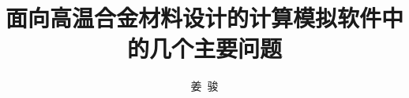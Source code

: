 
\title{面向高温合金材料设计的计算模拟软件中的几个主要问题}
\author[ ]{姜~骏}   %
\renewcommand*{\Authfont}{\small\rm} %
\renewcommand*{\Affilfont}{\small\it} %
\renewcommand\Authands{ and } %
\renewcommand\Authands{ , } %
\date{} %


\maketitle
